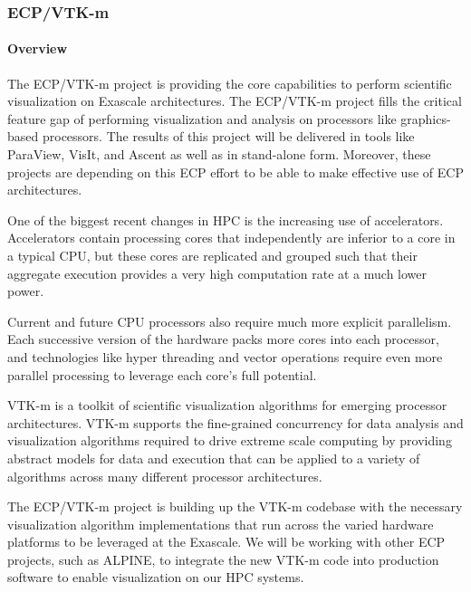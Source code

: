 \subsubsection{ ECP/VTK-m}

\paragraph{Overview}
The ECP/VTK-m project is providing the core capabilities to perform scientific visualization on Exascale architectures.
The ECP/VTK-m project fills the critical feature gap of performing visualization and analysis on processors like graphics-based processors.
The results of this project will be delivered in tools like ParaView, VisIt, and Ascent as well as in stand-alone form.
Moreover, these projects are depending on this ECP effort to be able to make effective use of ECP architectures.

One of the biggest recent changes in HPC is the increasing use of accelerators.
Accelerators contain processing cores that independently are inferior to a core in a typical CPU, but these cores are replicated and grouped such that their aggregate execution provides a very high computation rate at a much lower power.

Current and future CPU processors also require much more explicit parallelism.
Each successive version of the hardware packs more cores into each processor, and technologies like hyper threading and vector operations require even more parallel processing to leverage each core's full potential.

VTK-m is a toolkit of scientific visualization algorithms for emerging processor architectures.
VTK-m supports the fine-grained concurrency for data analysis and visualization algorithms required to drive extreme scale computing by providing abstract models for data and execution that can be applied to a variety of algorithms across many different processor architectures.

The ECP/VTK-m project is building up the VTK-m codebase with the necessary visualization algorithm implementations that run across the varied hardware platforms to be leveraged at the Exascale.
We will be working with other ECP projects, such as ALPINE, to integrate the new VTK-m code into production software to enable visualization on our HPC systems.

